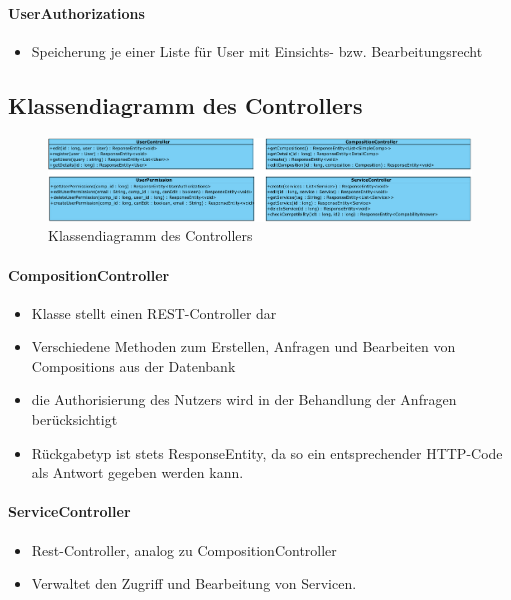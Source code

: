 \paragraph{UserAuthorizations}
\begin{itemize}
	\item Speicherung je einer Liste für User mit Einsichts- bzw. Bearbeitungsrecht
\end{itemize}

\subsection*{Klassendiagramm des Controllers}
\begin{figure}[!h]
	\centering
	\includegraphics[width=\textwidth]{img/Diagramme/Klassen/Controller}
	\caption{Klassendiagramm des Controllers}
	\label{fig:klassendiagramm-controller}
\end{figure}


\paragraph{CompositionController}
\begin{itemize}
	\item Klasse stellt einen REST-Controller dar
	\item Verschiedene Methoden zum Erstellen, Anfragen und Bearbeiten von Compositions aus der Datenbank
	\item die Authorisierung des Nutzers wird in der Behandlung der Anfragen berücksichtigt
	\item Rückgabetyp ist stets ResponseEntity, da so ein entsprechender HTTP-Code als Antwort gegeben werden kann.
\end{itemize}
\paragraph{ServiceController}
\begin{itemize}
	\item Rest-Controller, analog zu CompositionController
	\item Verwaltet den Zugriff und Bearbeitung von Servicen.
\end{itemize}
